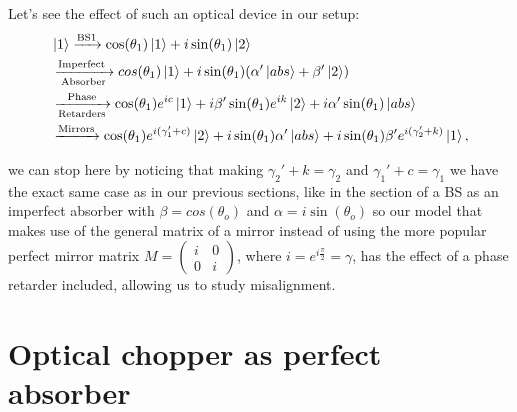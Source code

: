 \documentclass[12pt]{article}
\begin{document}
Let's see the effect of such an optical device in our setup:
\begin{align*}
&\ket{1}\xrightarrow{\text{BS1}}\cos(\theta_{1})\ket{1}+i\sin(\theta_{1})\ket{2}\\ &\xrightarrow[\text{Absorber}]{\text{Imperfect }}cos(\theta_{1})\ket{1}+i\sin(\theta_{1})(\alpha' \ket{abs} +\beta' \ket{2} )\\& \xrightarrow[\text{Retarders}]{\text{Phase}}\cos(\theta_{1})e^{ic}\ket{1}+i\beta'\sin(\theta_{1}) e^{ik}\ket{2} +i\alpha'\sin(\theta_{1}) \ket{abs}\\ &\xrightarrow{\text{Mirrors}} \cos(\theta_{1})e^{i(\gamma_{1}'+c)}\ket{2}+i \sin(\theta_{1})\alpha'\ket{abs}+i\sin(\theta_{1})\beta'e^{i(\gamma_{2}'+k)}\ket{1},
\end{align*}

we can stop here by noticing that making $\gamma_{2}'+k=\gamma_{2}$ and $\gamma_{1}'+c=\gamma_{1}$ we have the exact same case as in our previous sections, like in the section of a BS as an imperfect absorber with  $\beta=cos(\theta_{o})$ and $\alpha=i\sin(\theta_{o})$ so our model that makes use of the general matrix of a mirror instead of using the more popular perfect mirror matrix $M=\begin{pmatrix} i & 0\\0& i\end{pmatrix}$, where $i=e^{i \frac{\pi}{2}}=\gamma$, has the  effect of a phase retarder included, allowing us to study misalignment.
 
\pagebreak

\section{Optical chopper as perfect absorber }
 
\end{document}
